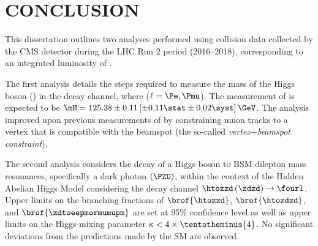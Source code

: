 \chapter{CONCLUSION}
\label{ch:conclusion}
This dissertation outlines two analyses performed using \pp collision data collected by the CMS detector during the LHC Run 2 period (2016--2018), corresponding to an integrated luminosity of \lumiruntwo.

The first analysis details the steps required to measure the mass of the Higgs boson (\mH) in the \hzzfourl decay channel, where ($\ell = \Pe, \Pmu$).
The measurement of \mH is expected to be $\mH = 125.38 \pm 0.11 \left[\pm 0.11 \stat \pm 0.02\syst \right] \GeV$.  %
The analysis improved upon previous measurements of \mH by constraining muon tracks to a vertex that is compatible with the beamspot (the so-called \emph{vertex$+$beamspot constraint}).

The second analysis considers the decay of a Higgs boson to BSM dilepton mass resonances, specifically a dark photon $\left( \PZD \right)$, within the context of the Hidden Abelian Higgs Model considering the decay channel $\htozzd \left( \zdzd \right) \to \fourl$.
Upper limits on the branching fractions of $\brof{\htozzd}$, $\brof{\htozdzd}$, and $\brof{\zdtoeepmormumupm}$ are set at 95\% confidence level as well as upper limits on the Higgs-mixing parameter $\kappa < 4 \times \tentotheminus{4}$.
No significant deviations from the predictions made by the SM are observed.